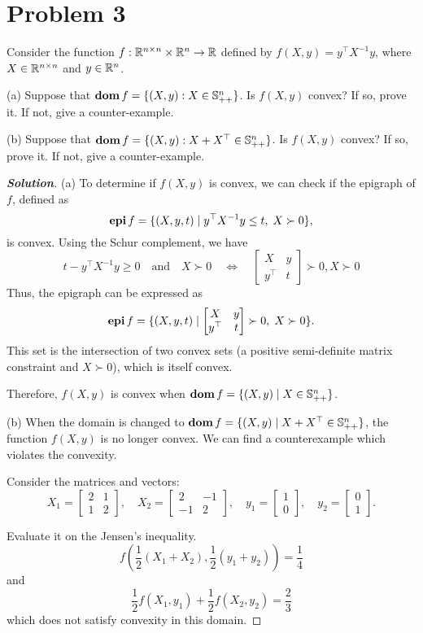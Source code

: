 \documentclass[11pt]{article}
\newenvironment{solution}
  {\renewcommand\qedsymbol{$\square$}\begin{proof}[\textbf{Solution}]}
  {\end{proof}}
\newcommand{\half}{\frac{1}{2}}
\newcommand{\T}{^\top}
\begin{document}
\clearpage
\section*{Problem 3}
Consider the function $f:{{\mathbb{R}}}^{n \times n}\times {{\mathbb{R}}}^n \rightarrow {{\mathbb{R}}}$ defined by $f(X, y) = y\T X^{-1}y$, where $X\in {{\mathbb{R}}}^{n\times n}$ and $y\in{{\mathbb{R}}}^n$.

(a) Suppose that $\mathop{\textbf{dom}} f=\{(X, y) : X\in{{\mathbb{S}}}^n_{++}\}$. Is $f(X, y)$ convex? If so, prove it. If not, give a counter-example.

(b) Suppose that $\dom f=\{(X, y): X+X\T \in\symm^n_{++}\}$. Is $f(X, y)$ convex? If so, prove it. If not, give a counter-example.


\begin{solution}
    (a)
    To determine if \( f(X, y) \) is convex, we can check if the epigraph of \( f \), defined as
    \[
    \epi f = \{ (X, y, t) \mid y\T X^{-1} y \leq t, \; X \succ 0 \},
    \]
    is convex. Using the Schur complement, we have
    \[
    t - y\T X^{-1} y \geq 0 \quad \text{and} \quad X \succ 0 \quad \Longleftrightarrow \quad \begin{bmatrix} X & y \\ y\T & t \end{bmatrix} \succ 0, X\succ 0 
    \]
    Thus, the epigraph can be expressed as
    \[
    \epi f = \{ (X, y, t) \mid \begin{bmatrix} X & y \\ y\T & t \end{bmatrix} \succ 0, \; X \succ 0 \}.
    \]
    This set is the intersection of two convex sets (a positive semi-definite matrix constraint and \( X \succ 0 \)), which is itself convex. 
    
    Therefore, \( f(X, y) \) is convex when \( \mathop{\textbf{dom}} f = \{(X, y) \mid X \in \mathbb{S}_{++}^n\} \).
    
    (b)
    When the domain is changed to \( \dom f = \{(X, y) \mid X + X\T \in \mathbb{S}_{++}^n \} \), the function \( f(X, y) \) is no longer convex. We can find a counterexample which violates the convexity.
    
    Consider the matrices and vectors:
    \[
    X_1 = \begin{bmatrix} 2 & 1 \\ 1 & 2 \end{bmatrix}, \quad X_2 = \begin{bmatrix} 2 & -1 \\ -1 & 2 \end{bmatrix}, \quad y_1 = \begin{bmatrix} 1 \\ 0 \end{bmatrix}, \quad y_2 = \begin{bmatrix} 0 \\ 1 \end{bmatrix}.
    \]
    
    Evaluate it on the Jensen's inequality.
    \[ f( \half (X_1 + X_2), \half(y_1 + y_2) ) = \frac{1}{4} \]
    and
    \[
        \half f(X_1, y_1) + \half f(X_2, y_2) = \frac{2}{3}
    \]
    which does not satisfy convexity in this domain.    
\end{solution}
\end{document}
